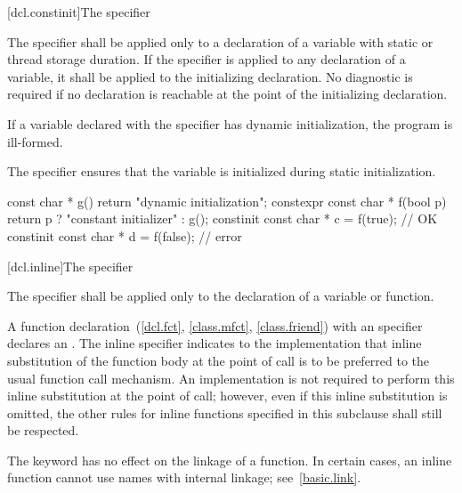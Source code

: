 [dcl.constinit]{The  specifier}

\pnum
The  specifier shall be applied only
to a declaration of a variable with static or thread storage duration.
If the specifier is applied to any declaration of a variable,
it shall be applied to the initializing declaration.
No diagnostic is required if no  declaration
is reachable at the point of the initializing declaration.

\pnum
If a variable declared with the  specifier has
dynamic initialization, the program is ill-formed.
\begin{note}
The  specifier ensures that the variable
is initialized during static initialization.
\end{note}

\pnum
\begin{example}
\begin{codeblock}
const char * g() { return "dynamic initialization"; }
constexpr const char * f(bool p) { return p ? "constant initializer" : g(); }
constinit const char * c = f(true);     // OK
constinit const char * d = f(false);    // error
\end{codeblock}
\end{example}

[dcl.inline]{The  specifier}%

\pnum
The  specifier shall be applied only to the declaration
of a variable or function.

\pnum
{}%
%
A function declaration~(\ref{dcl.fct}, \ref{class.mfct},
\ref{class.friend}) with an  specifier declares an
. The inline specifier indicates to
the implementation that inline substitution of the function body at the
point of call is to be preferred to the usual function call mechanism.
An implementation is not required to perform this inline substitution at
the point of call; however, even if this inline substitution is omitted,
the other rules for inline functions specified in this subclause shall
still be respected.
\begin{note}
The  keyword has no effect on the linkage of a function.
In certain cases, an inline function cannot use names with internal linkage;
see~\ref{basic.link}.
\end{note}


